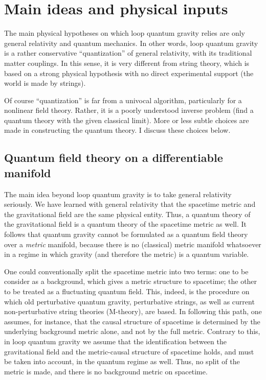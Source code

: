 \section{Main ideas and physical inputs}\label{4}

The main physical hypotheses on which loop quantum gravity relies 
are only general relativity and quantum mechanics.  In other 
words, loop quantum gravity is a rather conservative 
``quantization'' of general relativity,  with its 
traditional matter couplings.  In this sense, it is very 
different from string theory, which is based on a strong physical 
hypothesis with no direct experimental support (the world 
is made by strings).  

Of course ``quantization'' is far from a univocal algorithm, 
particularly for a nonlinear field theory.  Rather, it is a poorly 
understood inverse problem (find a quantum theory with the given 
classical limit).  More or less subtle choices are made in 
constructing the quantum theory.  I discuss these choices below.

\subsection{Quantum field theory on a differentiable manifold}

The main idea beyond loop quantum gravity is to take general 
relativity seriously.  We have learned with general relativity 
that the spacetime metric and the gravitational field are the same 
physical entity.  Thus, a quantum theory of the gravitational 
field is a quantum theory of the spacetime metric as well.  It 
follows that quantum gravity cannot be formulated as a quantum 
field theory over a {\em metric\/} manifold, because there is no 
(classical) metric manifold whatsoever in a regime in which 
gravity (and therefore the metric) is a quantum variable.

One could conventionally split the spacetime metric into two 
terms: one to be consider as a background, which gives a metric 
structure to spacetime; the other to be treated as a fluctuating 
quantum field.  This, indeed, is the procedure on which old 
perturbative quantum gravity, perturbative strings, as well as 
current non-perturbative string theories (M-theory), are based.  
In following this path, one assumes, for instance, that the 
causal structure of spacetime is determined by the underlying 
background metric alone, and not by the full metric.  Contrary to 
this, in loop quantum gravity we assume that the identification 
between the gravitational field and the metric-causal structure 
of spacetime holds, and must be taken into account, in the 
quantum regime as well.  Thus, no split of the metric is made, 
and there is no background metric on spacetime.

